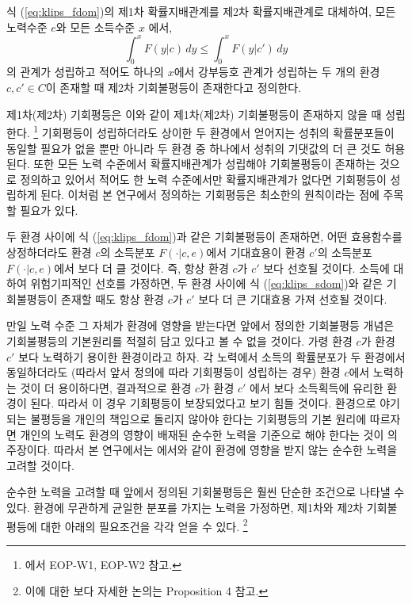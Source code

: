 식 (\ref{eq:klips_fdom})의 제1차 확률지배관계를 제2차 확률지배관계로 대체하여, 모든 노력수준 $e$와 모든 소득수준 $x$ 에서,
\begin{equation}
   \int_{0}^{x} F(y | c)\,dy \leq \int_{0}^{x} F(y | c')\,dy
    \label{eq:klips_sdom}
\end{equation}
의 관계가 성립하고 적어도 하나의 $x$에서 강부등호 관계가 성립하는 두 개의 환경 $c,c' \in C$이 존재할 때 제2차 기회불평등이 존재한다고 정의한다. 

제1차(제2차) 기회평등은 이와 같이 제1차(제2차) 기회불평등이 존재하지 않을 때 성립한다.
\footnote{\citet{letl09}에서 EOP-W1, EOP-W2 참고.} 
 기회평등이 성립하더라도 상이한 두 환경에서 얻어지는 성취의 확률분포들이 동일할 필요가 없을 뿐만 아니라 두 환경 중 하나에서 성취의 기댓값의 더 큰 것도 허용된다.
 또한 모든 노력 수준에서 확률지배관계가 성립해야 기회불평등이 존재하는 것으로 정의하고 있어서 적어도 한 노력 수준에서만 확률지배관계가 없다면 기회평등이 성립하게 된다. 
 이처럼 본 연구에서 정의하는 기회평등은 최소한의 원칙이라는 점에 주목할 필요가 있다.
 
두 환경 사이에 식 (\ref{eq:klips_fdom})과 같은 기회불평등이 존재하면, 어떤 효용함수를 상정하더라도 환경 $c$의 소득분포 $F(\cdot |c,e)$에서 기대효용이 환경 $c'$의 소득분포 $F(\cdot |c,e)$에서 보다 더 클 것이다.
  즉, 항상 환경 $c$가 $c'$ 보다 선호될 것이다.
  소득에 대하여 위험기피적인 선호를 가정하면, 두 환경 사이에 식 (\ref{eq:klips_sdom})와 같은 기회불평등이 존재할 때도 항상 환경 $c$가 $c'$ 보다 더 큰 기대효용 가져 선호될 것이다.
  
만일 노력 수준 그 자체가 환경에 영향을 받는다면 앞에서 정의한 기회불평등 개념은 기회불평등의 기본원리를 적절히 담고 있다고 볼 수 없을 것이다.
 가령 환경 $c$가 환경 $c'$ 보다 노력하기 용이한 환경이라고 하자.
 각 노력에서 소득의 확률분포가 두 환경에서 동일하더라도 (따라서 앞서 정의에 따라 기회평등이 성립하는 경우) 환경 $c$에서 노력하는 것이 더 용이하다면, 결과적으로 환경 $c$가 환경 $c'$ 에서 보다 소득획득에 유리한 환경이 된다.
 따라서 이 경우 기회평등이 보장되었다고 보기 힘들 것이다.
 환경으로 야기되는 불평등을 개인의 책임으로 돌리지 않아야 한다는 기회평등의 기본 원리에 따르자면 개인의 노력도 환경의 영향이 배재된 순수한 노력을 기준으로 해야 한다는 것이 \citet{Roemer98}의 주장이다.
 따라서 본 연구에서는 \citet{letl08, letl09}에서와 같이 환경에 영향을 받지 않는 순수한 노력을 고려할 것이다.
  
순수한 노력을 고려할 때 앞에서 정의된 기회불평등은 훨씬 단순한 조건으로 나타낼 수 있다.
 환경에 무관하게 균일한 분포를 가지는 노력을 가정하면, 제1차와 제2차 기회불평등에 대한 아래의 필요조건을 각각 얻을 수 있다.
\footnote{이에 대한 보다 자세한 논의는 \citet{letl09} Proposition 4 참고.}

